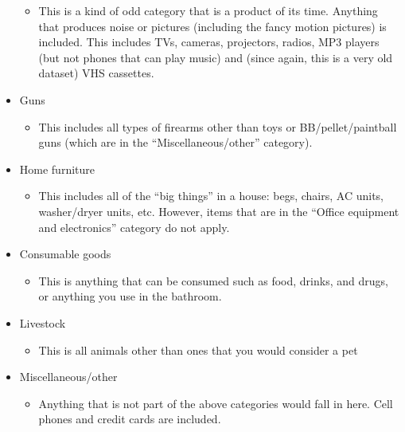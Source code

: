\documentclass[
]{krantz}
\providecommand{\tightlist}{%
  \setlength{\itemsep}{0pt}\setlength{\parskip}{0pt}}
\begin{document}
\begin{itemize}
  \begin{itemize}
  \tightlist
  \item
    This is a kind of odd category that is a product of its
    time. Anything that produces noise or pictures
    (including the fancy motion pictures) is included. This
    includes TVs, cameras, projectors, radios, MP3 players
    (but not phones that can play music) and (since again,
    this is a very old dataset) VHS cassettes.
  \end{itemize}
\item
  Guns

  \begin{itemize}
  \tightlist
  \item
    This includes all types of firearms other than toys or
    BB/pellet/paintball guns (which are in the
    ``Miscellaneous/other'' category).
  \end{itemize}
\item
  Home furniture

  \begin{itemize}
  \tightlist
  \item
    This includes all of the ``big things'' in a house:
    begs, chairs, AC units, washer/dryer units, etc.
    However, items that are in the ``Office equipment and
    electronics'' category do not apply.
  \end{itemize}
\item
  Consumable goods

  \begin{itemize}
  \tightlist
  \item
    This is anything that can be consumed such as food,
    drinks, and drugs, or anything you use in the bathroom.
  \end{itemize}
\item
  Livestock

  \begin{itemize}
  \tightlist
  \item
    This is all animals other than ones that you would
    consider a pet
  \end{itemize}
\item
  Miscellaneous/other

  \begin{itemize}
  \tightlist
  \item
    Anything that is not part of the above categories would
    fall in here. Cell phones and credit cards are included.
  \end{itemize}
\end{itemize}
\end{document}
